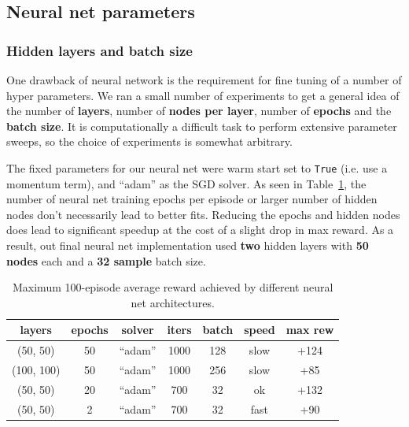\documentclass[conference]{IEEEtran}
\begin{document}
\subsection{Neural net parameters}\label{sec:nnparams}
\subsubsection{Hidden layers and batch size}
One drawback of neural network is the requirement for fine tuning of a number of hyper parameters. We ran a small number of experiments to get a general idea of the number of {\bf layers}, number of {\bf nodes per layer}, number of {\bf epochs} and the {\bf batch size}. It is computationally a difficult task to perform extensive parameter sweeps, so the choice of experiments is somewhat arbitrary. 

The fixed parameters for our neural net were warm start set to {\tt True} (i.e. use a momentum term), and ``adam'' as the SGD solver. As seen in Table~\ref{tab:nnarch}, the number of neural net training epochs per episode or larger number of hidden nodes don't necessarily lead to better fits. Reducing the epochs and hidden nodes does lead to significant speedup at the cost of a slight drop in max reward. As a result, out final neural net implementation used {\bf two} hidden layers with {\bf 50 nodes} each and a {\bf 32 sample} batch size.
\begin{table}[bpht]
\begin{center}
\begin{tabular}{|c|c|c|c|c|c|c|}
\hline
layers & epochs & solver & iters & batch & speed & max rew\\ \hline 
(50, 50) & 50 & ``adam'' & 1000 & 128 & slow & +124 \\
(100, 100) & 50 & ``adam'' & 1000 & 256 & slow & +85 \\
(50, 50) & 20 & ``adam'' & 700 & 32 & ok & +132 \\
(50, 50) & 2 & ``adam'' & 700 & 32 & fast & +90 \\ \hline
\end{tabular}
\end{center}
\caption{Maximum 100-episode average reward achieved by different neural net architectures. \label{tab:nnarch}}
\end{table}
%
\end{document}
